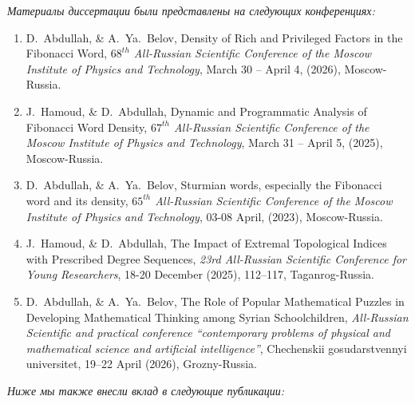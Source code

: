 \documentclass[a4paper,14pt]{extreport}
\theoremstyle{plain}
\theoremstyle{definition}
\theoremstyle{remark}
\begin{document}
	\textit{Материалы диссертации были представлены на следующих конференциях:}
	\begin{enumerate}
		
		\item D.~Abdullah, \& A.~Ya.~Belov, Density of Rich and Privileged Factors in the Fibonacci Word, {\em $68^{th}$ All-Russian Scientific Conference of the Moscow Institute of Physics and Technology}, March 30 – April 4, (2026), Moscow-Russia.
		
		\item J.~Hamoud, \& D.~Abdullah,  Dynamic and Programmatic Analysis of Fibonacci Word Density, {\em $67^{th}$ All-Russian Scientific Conference of the Moscow Institute of Physics and Technology}, March 31 – April 5, (2025), Moscow-Russia.
		
		\item D.~Abdullah, \& A.~Ya.~Belov, Sturmian words, especially the Fibonacci word and its density, {\em $65^{th}$ All-Russian Scientific Conference of the Moscow Institute of Physics and Technology}, 03-08 April, (2023), Moscow-Russia.
		
		\item J.~Hamoud, \& D.~Abdullah, The Impact of Extremal Topological Indices with Prescribed Degree Sequences, {\em 23rd All-Russian Scientific Conference for Young Researchers}, 18-20 December (2025), 112--117, Taganrog-Russia.
		
		\item D.~Abdullah, \& A.~Ya.~Belov, The Role of Popular Mathematical Puzzles in Developing Mathematical Thinking among Syrian Schoolchildren, {\em All-Russian Scientific and practical conference ``contemporary problems of physical and mathematical science and artificial intelligence''},  Chechenskii gosudarstvennyi universitet, 19–22 April (2026), Grozny-Russia.
		
	\end{enumerate}
	
	\textit{Ниже мы также внесли вклад в следующие публикации:}
	
\end{document}
